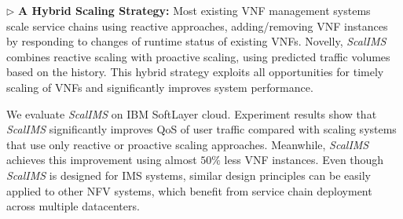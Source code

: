 $\triangleright$ \textbf{A Hybrid Scaling Strategy:} Most existing VNF management systems~\cite{wood2007black}~\cite{gember2012stratos} scale service chains using reactive approaches, adding/removing VNF instances by responding to changes of runtime status of existing VNFs. Novelly, \textit{ScalIMS} combines reactive scaling with proactive scaling, using predicted traffic volumes based on the history. This hybrid strategy exploits all opportunities for timely scaling of VNFs and significantly improves system performance.

We evaluate \textit{ScalIMS} on IBM SoftLayer cloud. Experiment results show that \textit{ScalIMS} significantly improves QoS of user traffic compared with scaling systems that use only reactive or proactive scaling approaches. Meanwhile, \textit{ScalIMS} achieves this improvement %
 using almost $50\%$ less VNF instances. %
Even though \textit{ScalIMS} is designed for IMS systems, similar design principles can be easily applied to other NFV systems, which benefit from service chain deployment across multiple datacenters.



